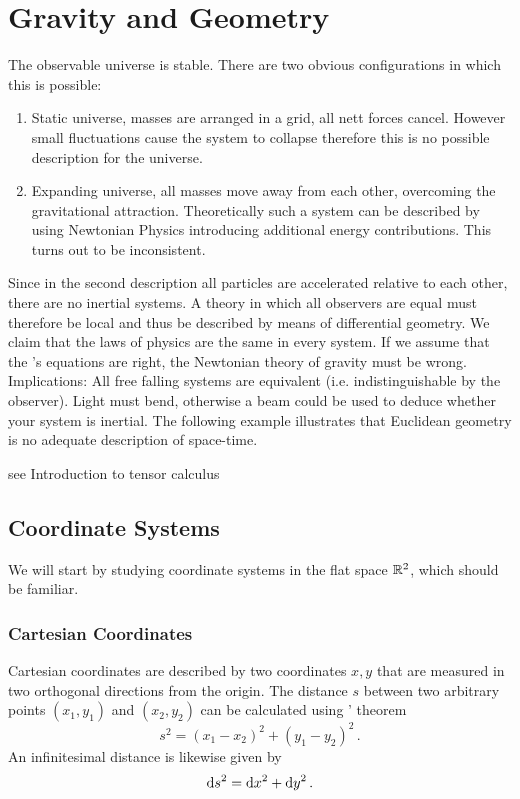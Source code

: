 \chapter{Gravity and Geometry}
The observable universe is stable. There are two obvious configurations in which this is possible:
\begin{enumerate}
    \item Static universe, masses are arranged in a grid, all nett forces cancel.
    However small fluctuations cause the system to collapse therefore this is
    no possible description for the universe. 
    \item Expanding universe, all masses move away from each other, overcoming the gravitational attraction.
    Theoretically such a system can be described by using Newtonian Physics introducing additional energy contributions.
    This turns out to be inconsistent.
\end{enumerate}
Since in the second description all particles are accelerated relative to each other, there are no inertial systems.
A theory in which all observers are equal must therefore be local and thus be described by means of differential geometry.
We claim that the laws of physics are the same in every system.
If we assume that the 's equations are right, the
Newtonian theory of gravity must be wrong.
Implications:
All free falling systems are equivalent (i.e. indistinguishable by the observer).
Light must bend, otherwise a beam could be used to deduce whether your system is inertial.
The following example illustrates that Euclidean geometry is no
adequate description of space-time.
\begin{example}
see Introduction to tensor calculus
\end{example}
\section{Coordinate Systems}
We will start by studying coordinate systems in the flat space $\mathbb{R}^2$, which
should be familiar.
\subsection*{Cartesian Coordinates}
Cartesian coordinates are described by two coordinates $x,y$ that are measured
in two orthogonal directions from the origin. The distance $s$ between two
arbitrary points $(x_1,y_1)$ and $(x_2,y_2)$ can be calculated using
' theorem
\begin{equation}
    s^2=(x_1-x_2)^2+(y_1-y_2)^2\,.
\end{equation}
An infinitesimal distance is likewise given by
\begin{equation}
    \dif s^2=\dif x^2+\dif y^2\,.  \label{eq:cartline}
\end{equation}
